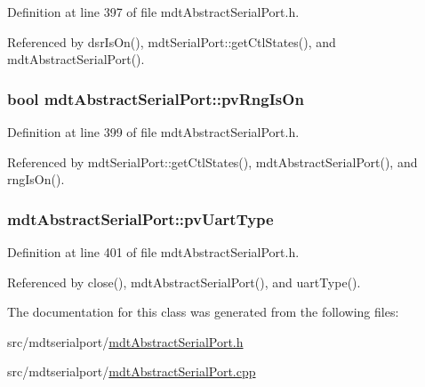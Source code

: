 Definition at line 397 of file mdt\-Abstract\-Serial\-Port.\-h.



Referenced by dsr\-Is\-On(), mdt\-Serial\-Port\-::get\-Ctl\-States(), and mdt\-Abstract\-Serial\-Port().

\hypertarget{classmdt_abstract_serial_port_a4266877d6076e12be767afe3e967c083}{
\subsubsection[{pv\-Rng\-Is\-On}]{\setlength{\rightskip}{0pt plus 5cm}bool mdt\-Abstract\-Serial\-Port\-::pv\-Rng\-Is\-On\hspace{0.3cm}{\ttfamily [protected]}}}\label{classmdt_abstract_serial_port_a4266877d6076e12be767afe3e967c083}


Definition at line 399 of file mdt\-Abstract\-Serial\-Port.\-h.



Referenced by mdt\-Serial\-Port\-::get\-Ctl\-States(), mdt\-Abstract\-Serial\-Port(), and rng\-Is\-On().

\hypertarget{classmdt_abstract_serial_port_aaf058f1d9a256a0351652fc831f5f8bf}{
\subsubsection[{pv\-Uart\-Type}]{ mdt\-Abstract\-Serial\-Port\-::pv\-Uart\-Type\hspace{0.3cm}{\ttfamily [protected]}}}\label{classmdt_abstract_serial_port_aaf058f1d9a256a0351652fc831f5f8bf}


Definition at line 401 of file mdt\-Abstract\-Serial\-Port.\-h.



Referenced by close(), mdt\-Abstract\-Serial\-Port(), and uart\-Type().



The documentation for this class was generated from the following files\-:\begin{DoxyCompactItemize}
\item 
src/mdtserialport/\hyperlink{mdt_abstract_serial_port_8h}{mdt\-Abstract\-Serial\-Port.\-h}\item 
src/mdtserialport/\hyperlink{mdt_abstract_serial_port_8cpp}{mdt\-Abstract\-Serial\-Port.\-cpp}\end{DoxyCompactItemize}

